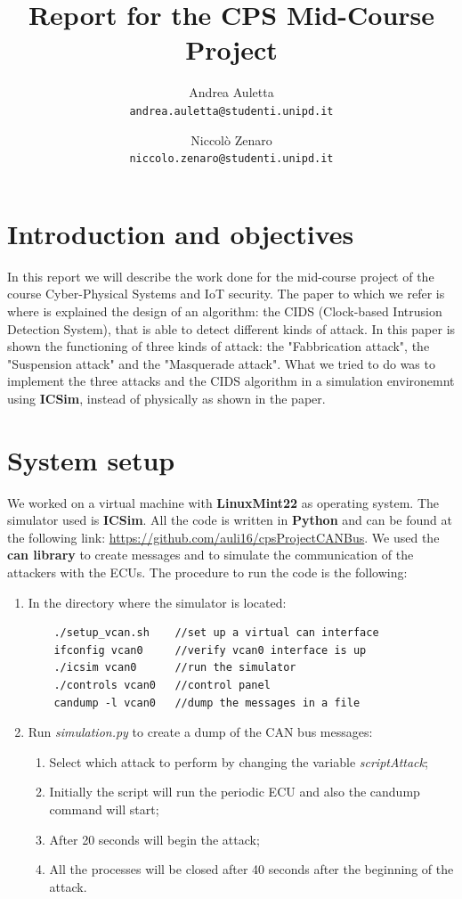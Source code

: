 \documentclass[12pt]{article}
\title{Report for the CPS Mid-Course Project}
\author{
    Andrea Auletta \\ \texttt{andrea.auletta@studenti.unipd.it} \and
    Niccolò Zenaro \\ \texttt{niccolo.zenaro@studenti.unipd.it}
}
\begin{document}
\maketitle
\newpage
\tableofcontents
\newpage

\section{Introduction and objectives}
In this report we will describe the work done for the mid-course project of the course 
Cyber-Physical Systems and IoT security. 
The paper to which we refer is \textbf{\cite{Cho2016} } where is explained 
the design of an algorithm: the CIDS (Clock-based Intrusion Detection System), that is able 
to detect different kinds of attack. In this paper is shown the functioning of three kinds 
of attack: the "Fabbrication attack", the "Suspension attack" and the "Masquerade attack". 
What we tried to do was to implement the three attacks and the CIDS algorithm in a simulation 
environemnt using \textbf{ICSim}, instead of physically as shown in the paper.
\section{System setup}
We worked on a virtual machine with \textbf{LinuxMint22} as operating system.
The simulator used is \textbf{ICSim}. All the code is written in \textbf{Python} and can 
be found at the following link: \href{https://github.com/auli16/cpsProjectCANBus}{https://github.com/auli16/cpsProjectCANBus}.
We used the \textbf{can library} to create messages and to simulate the communication of the attackers with 
the ECUs.
The procedure to run the code is the following:
\begin{enumerate}
    \item In the directory where the simulator is located:
    \begin{verbatim}
    ./setup_vcan.sh    //set up a virtual can interface 
    ifconfig vcan0     //verify vcan0 interface is up
    ./icsim vcan0      //run the simulator
    ./controls vcan0   //control panel
    candump -l vcan0   //dump the messages in a file
    \end{verbatim}
    \item Run \textit{simulation.py} to create a dump of the CAN bus messages:
    \begin{enumerate}
        \item Select which attack to perform by changing the variable \textit{scriptAttack};
        \item Initially the script will run the periodic ECU and also the candump command
        will start;
        \item After 20 seconds will begin the attack;
        \item All the processes will be closed after 40 seconds after the beginning of the attack.
    \end{enumerate}
    
\end{enumerate}
\end{document}
